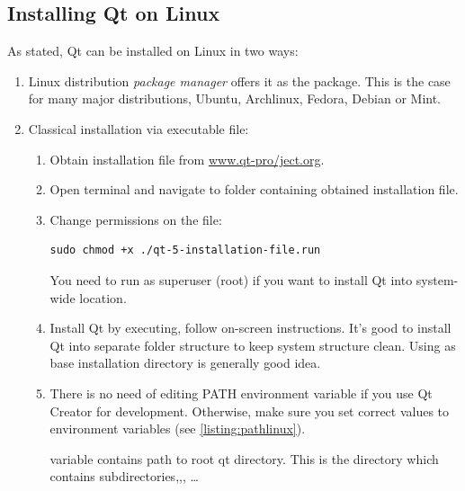 \subsection{Installing Qt on Linux}
As stated, Qt can be installed on Linux in two ways:
\begin{enumerate}
\item Linux distribution \textit{package manager} offers it as the package. This is the case for many major distributions, \eg Ubuntu, Archlinux, Fedora, Debian or Mint.
\item Classical installation via executable file:
\begin{enumerate}
\item Obtain installation file from \href{http://www.qt-project.org/}{www.qt-pro\-/ject.org}.
\item Open terminal and navigate to folder containing obtained installation file.
\item Change permissions on the file:
\begin{lstlisting}[firstnumber=1,language=text]
sudo chmod +x ./qt-5-installation-file.run
\end{lstlisting}
You need to run as superuser (root) if you want to install Qt into system-wide location.

\item Install Qt by executing, follow on-screen instructions. It's good to install Qt into separate folder structure to keep system structure clean. Using as base installation directory is generally good idea.

\item There is no need of editing PATH environment variable if you use Qt Creator for development. Otherwise, make sure you set correct values to environment variables (see \autoref{listing:pathlinux}).
 variable contains path to root qt directory. This is the directory which contains subdirectories,,, \ldots
\end{enumerate}
\end{enumerate}

